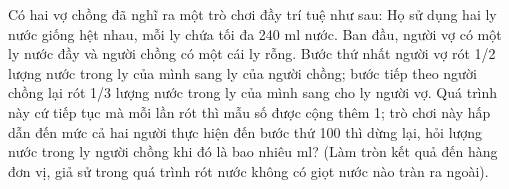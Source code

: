 \begin{ex}%
	Có hai vợ chồng đã nghĩ ra một trò chơi đầy trí tuệ như sau: Họ sử dụng hai ly nước giống hệt nhau, mỗi ly chứa tối đa 240 ml nước. Ban đầu, người vợ có một ly nước đầy và người chồng có một cái ly rỗng. Bước thứ nhất người vợ rót 1/2 lượng nước trong ly của mình sang ly của người chồng; bước tiếp theo người chồng lại rót 1/3 lượng nước trong ly của mình sang cho ly người vợ. Quá trình này cứ tiếp tục mà mỗi lần rót thì mẫu số được cộng thêm 1; trò chơi này hấp dẫn đến mức cả hai người thực hiện đến bước thứ 100 thì dừng lại, hỏi lượng nước trong ly người chồng khi đó là bao nhiêu ml? (Làm tròn kết quả đến hàng đơn vị, giả sử trong quá trình rót nước không có giọt nước nào tràn ra ngoài).
\end{ex}
